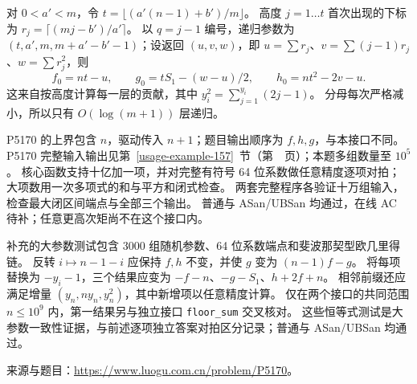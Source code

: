 对 $0<a'<m$，令 $t=\lfloor(a'(n-1)+b')/m\rfloor$。
高度 $j=1\ldots t$ 首次出现的下标为 $r_j=\lceil(mj-b')/a'\rceil$。
以 $q=j-1$ 编号，递归参数为 $(t,a',m,m+a'-b'-1)$；设返回 $(u,v,w)$，即
$u=\sum r_j$、$v=\sum(j-1)r_j$、$w=\sum r_j^2$，则
\[
f_0=nt-u,\qquad g_0=tS_1-(w-u)/2,\qquad h_0=nt^2-2v-u.
\]
这来自按高度计算每一层的贡献，其中 $y_i^2=\sum_{j=1}^{y_i}(2j-1)$。
分母每次严格减小，所以只有 $O(\log(m+1))$ 层递归。

P5170 的上界包含 $n$，驱动传入 $n+1$；题目输出顺序为 $f,h,g$，与本接口不同。
P5170 完整输入输出见第~\ref{usage-example-157}~节（第~\pageref{usage-example-157}~页）；本题多组数量至 $10^5$。
核心函数支持十亿加一项，并对完整有符号 64 位系数做任意精度逐项对拍；
大项数用一次多项式的和与平方和闭式检查。
两套完整程序各验证十万组输入，检查最大闭区间端点与全部三个输出。
普通与 ASan/UBSan 均通过，在线 AC 待补；任意更高次矩尚不在这个接口内。

补充的大参数测试包含 3000 组随机参数、64 位系数端点和斐波那契型欧几里得链。
反转 $i\mapsto n-1-i$ 应保持 $f,h$ 不变，并使 $g$ 变为 $(n-1)f-g$。
将每项替换为 $-y_i-1$，三个结果应变为 $-f-n$、$-g-S_1$、$h+2f+n$。
相邻前缀还应满足增量 $(y_n,ny_n,y_n^2)$，其中新增项以任意精度计算。
仅在两个接口的共同范围 $n\le10^9$ 内，第一结果另与独立接口 \texttt{floor\_sum} 交叉核对。
这些恒等式测试是大参数一致性证据，与前述逐项独立答案对拍区分记录；普通与 ASan/UBSan 均通过。

来源与题目：\url{https://www.luogu.com.cn/problem/P5170}。

